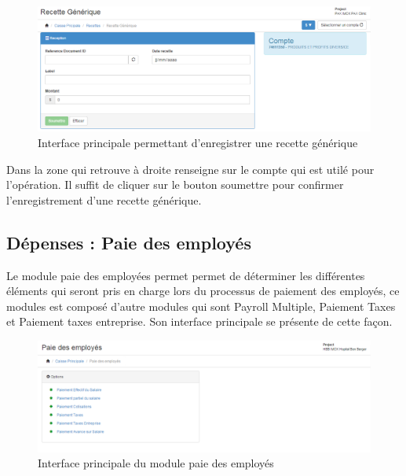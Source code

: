 \documentclass[12pt,a4paper]{report}
\begin{document}
\begin{figure}[h]
\begin{center}
\includegraphics[width=14cm]{pic/recetteGen2.png}
\end{center}
\caption{Interface principale permettant d'enregistrer une recette générique}
\label{Interface principale permettant d'enregistrer une recette générique}
\end{figure}

Dans la zone qui retrouve à droite renseigne sur le compte qui est utilé pour l'opération. Il suffit de cliquer sur le bouton soumettre pour confirmer l'enregistrement d'une recette générique.

\subsection{Dépenses : Paie des employés}
Le module paie des employées permet permet de déterminer les différentes éléments qui seront pris en charge lors du processus de paiement des employés, ce modules est composé d'autre modules qui sont Payroll Multiple, Paiement Taxes et Paiement taxes entreprise. Son interface principale se présente de cette façon.


\begin{figure}[h]
\begin{center}
\includegraphics[width=16cm]{pic/paieEmp.png}
\end{center}
\caption{Interface principale du module paie des employés}
\label{Interface principale du module paie des employés}
\end{figure}
\end{document}
